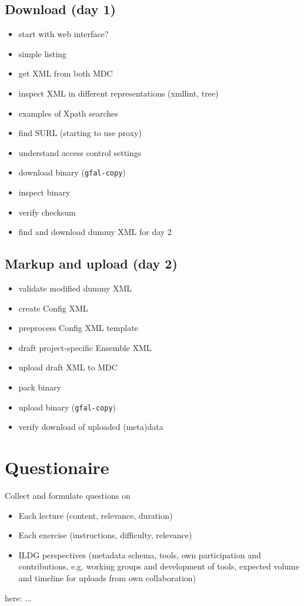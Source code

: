 \documentclass{article}
\begin{document}
\subsection{Download (day 1)}
\begin{itemize}
    \item start with web interface?
    \item simple listing
    \item get XML from both MDC
    \item inspect XML in different representations (xmllint, tree)
    \item examples of Xpath searches
    \item find SURL (starting to use proxy)
    \item understand access control settings
    \item download binary ({\tt gfal-copy})
    \item inspect binary
    \item verify checksum
    \item find and download dummy XML for day 2
\end{itemize}

\subsection{Markup and upload (day 2)}
\begin{itemize}
    \item validate modified dummy XML
    \item create Config XML
    \item preprocess Config XML template
    \item draft project-specific Ensemble XML
    \item upload draft XML to MDC
    \item pack binary
    \item upload binary ({\tt gfal-copy})
    \item verify download of uploaded (meta)data
\end{itemize}

\section{Questionaire}
Collect and formulate questions on
\begin{itemize}
    \item Each lecture (content, relevance, duration)
    \item Each exercise (instructions, difficulty, relevance)
    \item ILDG perspectives (metadata schema, tools, own participation and contributions, e.g. working groups and development of tools, expected volume and timeline for uploads from own collaboration) 
\end{itemize}
here:
...



\end{document}
